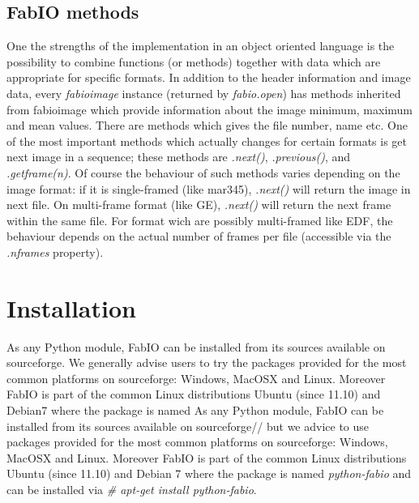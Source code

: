 \documentclass[preprint ]{iucr}
\begin{document}
\subsection{FabIO methods}



One the strengths of the implementation in an object oriented language
is the possibility to combine functions (or methods) together with data which
are appropriate for specific formats.
In addition to the header information and image data, every {\em fabioimage}
instance (returned by {\em fabio.open}) has methods inherited from fabioimage 
which provide information about the image minimum, maximum and mean values.
There are methods which gives the file number, name etc. One of the most
important methods which actually changes for certain formats  is get next image
in a sequence; these methods are {\em .next()}, {\em .previous()}, and {\em
.getframe(n)}. Of course the behaviour of such methods varies depending on the
image format: if it is single-framed (like mar345),  {\em .next()} will
return the image in next file. On multi-frame format (like GE), {\em .next()} will
return the next frame within the same file. For format wich are possibly multi-framed like
EDF, the behaviour depends on the actual number of frames per file (accessible
via the {\em .nframes} property).


\section{Installation}

As any Python module, FabIO can be installed from its sources available on 
sourceforge\cite{fabio}.
We generally advise users to try the packages provided for the most common
platforms on sourceforge: Windows, MacOSX and Linux. 
Moreover FabIO is part of
the common Linux distributions Ubuntu (since 11.10) and Debian7 where the package is named
As any Python module, FabIO can be installed from its sources available on sourceforge//\cite{fabio}
but we advice to use packages provided for the most common
platforms on sourceforge: Windows, MacOSX and Linux. Moreover FabIO is part of
the common Linux distributions Ubuntu (since 11.10) and Debian 7 where the package is named
{\em python-fabio} and can be installed via {\em \# apt-get install python-fabio}.
\end{document}

